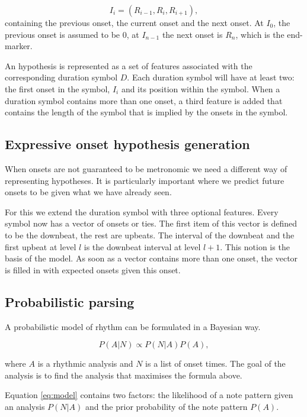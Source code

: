 \documentclass[a4paper,10pt]{article}
\begin{document}
\begin{equation}
I_i = (R_{i-1}, R_i, R_{i+1}),
\end{equation}
containing the previous onset, the current onset and the next onset. At $I_0$, the previous onset is assumed to be $0$, at $I_{n-1}$ the next onset is $R_n$, which is the end-marker. 

An hypothesis is represented as a set of features associated with the corresponding duration symbol $D$. Each duration symbol will have at least two: the first onset in the symbol, $I_i$ and its position within the symbol. When a duration symbol contains more than one onset, a third feature is added that contains the length of the symbol that is implied by the onsets in the symbol.

\subsection{Expressive onset hypothesis generation}

When onsets are not guaranteed to be metronomic we need a different way of representing hypotheses. It is particularly important where we predict future onsets to be given what we have already seen.

For this we extend the duration symbol with three optional features. Every symbol now has a vector of onsets or ties. The first item of this vector is defined to be the downbeat, the rest are upbeats. The interval of the downbeat and the first upbeat at level $l$ is the downbeat interval at level $l+1$. This notion is the basis of the model. As soon as a vector contains more than one onset, the vector is filled in with expected onsets given this onset.
\subsection*{Probabilistic parsing}

A probabilistic model of rhythm can be formulated in a Bayesian way. 

\begin{equation}
\label{eq:model}
P(A|N) \propto P(N|A)P(A),
\end{equation}

where $A$ is a rhythmic analysis and $N$ is a list of onset times. The goal of the analysis is to find the analysis that maximises the formula above.

Equation \ref{eq:model} contains two factors: the likelihood of a note pattern given an analysis $P(N|A)$ and the prior probability of the note pattern $P(A)$. 
\end{document}
